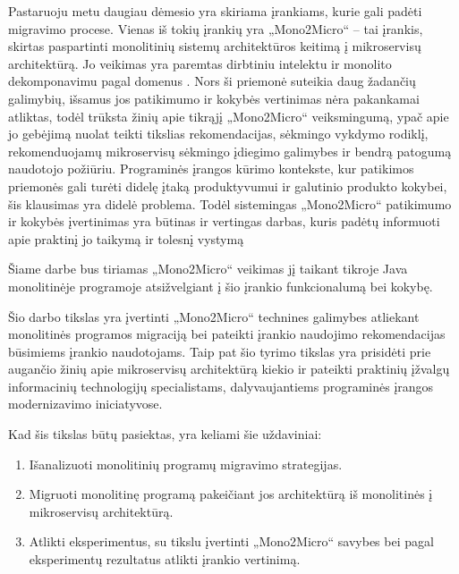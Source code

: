 \documentclass{VUMIFPSbakalaurinis}
\begin{document}
Pastaruoju metu daugiau dėmesio yra skiriama įrankiams, kurie gali padėti migravimo procese. Vienas iš tokių įrankių yra „Mono2Micro“ -- tai įrankis, skirtas paspartinti monolitinių sistemų architektūros keitimą į mikroservisų architektūrą. Jo veikimas yra paremtas dirbtiniu intelektu ir monolito dekomponavimu pagal domenus \cite{KXK+21}. %
Nors ši priemonė suteikia daug žadančių galimybių, išsamus jos patikimumo ir kokybės vertinimas nėra pakankamai atliktas, todėl trūksta žinių apie tikrąjį „Mono2Micro“ veiksmingumą, ypač apie jo gebėjimą nuolat teikti tikslias rekomendacijas, sėkmingo vykdymo rodiklį, rekomenduojamų mikroservisų sėkmingo įdiegimo galimybes ir bendrą patogumą naudotojo požiūriu. Programinės įrangos kūrimo kontekste, kur patikimos priemonės gali turėti didelę įtaką produktyvumui ir galutinio produkto kokybei, šis klausimas yra didelė problema. Todėl sistemingas „Mono2Micro“ patikimumo ir kokybės įvertinimas yra būtinas ir vertingas darbas, kuris padėtų informuoti apie praktinį jo taikymą ir tolesnį vystymą

Šiame darbe bus tiriamas „Mono2Micro“ veikimas jį taikant tikroje Java monolitinėje programoje atsižvelgiant į šio įrankio funkcionalumą bei kokybę.

Šio darbo tikslas yra įvertinti „Mono2Micro“ technines galimybes atliekant monolitinės programos migraciją bei pateikti įrankio naudojimo rekomendacijas būsimiems įrankio naudotojams. Taip pat šio tyrimo tikslas yra prisidėti prie augančio žinių apie mikroservisų architektūrą kiekio ir pateikti praktinių įžvalgų informacinių technologijų specialistams, dalyvaujantiems programinės įrangos modernizavimo iniciatyvose.

Kad šis tikslas būtų pasiektas, yra keliami šie uždaviniai:
\begin{enumerate}

    \item Išanalizuoti monolitinių programų migravimo strategijas.

    \item Migruoti monolitinę programą pakeičiant jos architektūrą iš monolitinės į mikroservisų architektūrą.

    \item Atlikti eksperimentus, su tikslu įvertinti „Mono2Micro“ savybes bei pagal eksperimentų rezultatus atlikti įrankio vertinimą.
    
\end{enumerate}
\end{document}
